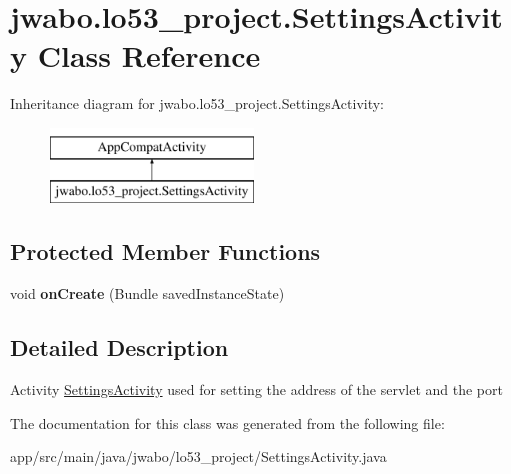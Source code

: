\hypertarget{classjwabo_1_1lo53__project_1_1_settings_activity}{}\section{jwabo.\+lo53\+\_\+project.\+Settings\+Activity Class Reference}
\label{classjwabo_1_1lo53__project_1_1_settings_activity}
Inheritance diagram for jwabo.\+lo53\+\_\+project.\+Settings\+Activity\+:\begin{figure}[H]
\begin{center}
\leavevmode
\includegraphics[height=2.000000cm]{classjwabo_1_1lo53__project_1_1_settings_activity}
\end{center}
\end{figure}
\subsection*{Protected Member Functions}
\begin{DoxyCompactItemize}
\item 
void {\bfseries on\+Create} (Bundle saved\+Instance\+State)\hypertarget{classjwabo_1_1lo53__project_1_1_settings_activity_ae221b0e510188aa06fd01b18b5de6cfa}{}\label{classjwabo_1_1lo53__project_1_1_settings_activity_ae221b0e510188aa06fd01b18b5de6cfa}

\end{DoxyCompactItemize}


\subsection{Detailed Description}
Activity \hyperlink{classjwabo_1_1lo53__project_1_1_settings_activity}{Settings\+Activity} used for setting the address of the servlet and the port 

The documentation for this class was generated from the following file\+:\begin{DoxyCompactItemize}
\item 
app/src/main/java/jwabo/lo53\+\_\+project/Settings\+Activity.\+java\end{DoxyCompactItemize}
